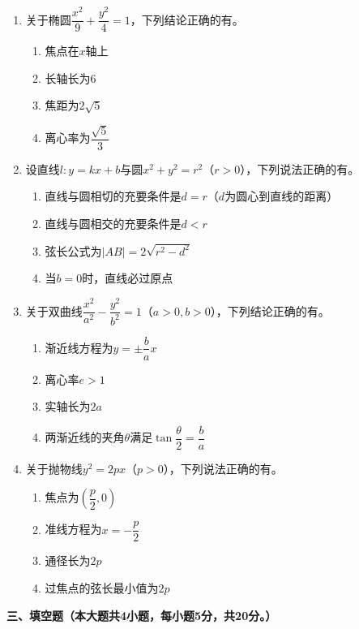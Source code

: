 \documentclass[12pt, a4paper]{ctexart}
\newcommand{\blank}[1]{\underline{\hspace{#1}}}
\begin{document}
\begin{enumerate}[start=9]
\item 关于椭圆$\dfrac{x^2}{9}+\dfrac{y^2}{4}=1$，下列结论正确的有\blank{3cm}。
\begin{enumerate}[label=\Alph*.]
\item 焦点在$x$轴上
\item 长轴长为$6$
\item 焦距为$2\sqrt{5}$
\item 离心率为$\dfrac{\sqrt{5}}{3}$
\end{enumerate}

\item 设直线$l:y=kx+b$与圆$x^2+y^2=r^2$（$r>0$），下列说法正确的有\blank{3cm}。
\begin{enumerate}[label=\Alph*.]
\item 直线与圆相切的充要条件是$d=r$（$d$为圆心到直线的距离）
\item 直线与圆相交的充要条件是$d<r$
\item 弦长公式为$|AB|=2\sqrt{r^2-d^2}$
\item 当$b=0$时，直线必过原点
\end{enumerate}

\item 关于双曲线$\dfrac{x^2}{a^2}-\dfrac{y^2}{b^2}=1$（$a>0,b>0$），下列结论正确的有\blank{3cm}。
\begin{enumerate}[label=\Alph*.]
\item 渐近线方程为$y=\pm\dfrac{b}{a}x$
\item 离心率$e>1$
\item 实轴长为$2a$
\item 两渐近线的夹角$\theta$满足$\tan\dfrac{\theta}{2}=\dfrac{b}{a}$
\end{enumerate}

\item 关于抛物线$y^2=2px$（$p>0$），下列说法正确的有\blank{3cm}。
\begin{enumerate}[label=\Alph*.]
\item 焦点为$\left(\dfrac{p}{2},0\right)$
\item 准线方程为$x=-\dfrac{p}{2}$
\item 通径长为$2p$
\item 过焦点的弦长最小值为$2p$
\end{enumerate}
\end{enumerate}

\vspace{1em}

\noindent\textbf{三、填空题（本大题共4小题，每小题5分，共20分。）}
\end{document}

